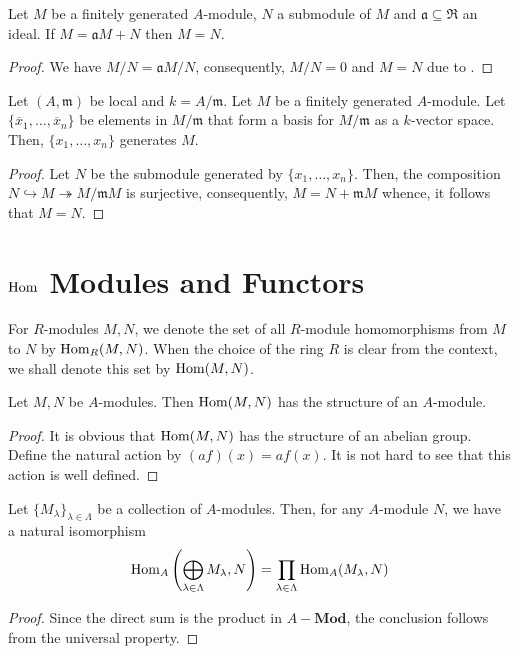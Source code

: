 \begin{corollary}
    Let $M$ be a finitely generated $A$-module, $N$ a submodule of $M$ and $\mathfrak a\subseteq\mathfrak R$ an ideal. If $M = \mathfrak aM + N$ then $M = N$.
\end{corollary}
\begin{proof}
    We have $M/N = \mathfrak aM/N$, consequently, $M/N = 0$ and $M = N$ due to .
\end{proof}

\begin{lemma}
    Let $(A,\mathfrak m)$ be local and $k = A/\mathfrak m$. Let $M$ be a finitely generated $A$-module. Let $\{\overline x_1,\ldots,\overline x_n\}$ be elements in $M/\mathfrak m$ that form a basis for $M/\mathfrak m$ as a $k$-vector space. Then, $\{x_1,\ldots,x_n\}$ generates $M$.
\end{lemma}
\begin{proof}
    Let $N$ be the submodule generated by $\{x_1,\ldots,x_n\}$. Then, the composition $N\hookrightarrow M\twoheadrightarrow M/\mathfrak mM$ is surjective, consequently, $M = N + \mathfrak mM$ whence, it follows that $M = N$.
\end{proof}

\section{\texorpdfstring{$\operatorname{Hom}$}{} Modules and Functors}

For $R$-modules $M,N$, we denote the set of all $R$-module homomorphisms from $M$ to $N$ by $\operatorname{Hom}_R(M,N)$. When the choice of the ring $R$ is clear from the context, we shall denote this set by $\operatorname{Hom}(M,N)$.

\begin{proposition}
    Let $M,N$ be $A$-modules. Then $\operatorname{Hom}(M,N)$ has the structure of an $A$-module.
\end{proposition}
\begin{proof}
    It is obvious that $\operatorname{Hom}(M,N)$ has the structure of an abelian group. Define the natural action by $(af)(x) = af(x)$. It is not hard to see that this action is well defined.
\end{proof}

\begin{proposition}
    Let $\{M_\lambda\}_{\lambda\in\Lambda}$ be a collection of $A$-modules. Then, for any $A$-module $N$, we have a natural isomorphism
    \begin{equation*}
        \operatorname{Hom}_A\left(\bigoplus_{\lambda\in\Lambda}M_\lambda, N\right) = \prod_{\lambda\in\Lambda}\operatorname{Hom}_A(M_\lambda,N)
    \end{equation*}
\end{proposition}
\begin{proof}
    Since the direct sum is the product in $A-\mathbf{Mod}$, the conclusion follows from the universal property.
\end{proof}

